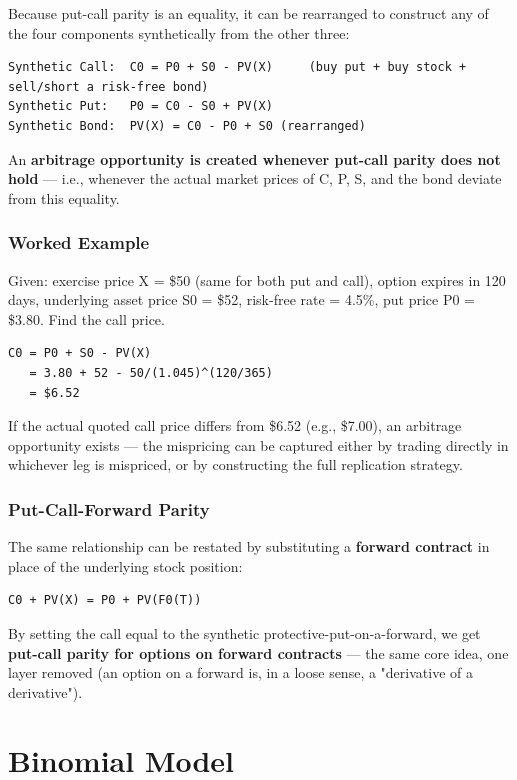 \documentclass[12pt,openany]{book}
\theoremstyle{definition}
\theoremstyle{remark}
\begin{document}
Because put-call parity is an equality, it can be rearranged to construct any of the four components synthetically from the other three:

\begin{lstlisting}[style=notesCode]
Synthetic Call:  C0 = P0 + S0 - PV(X)     (buy put + buy stock + sell/short a risk-free bond)
Synthetic Put:   P0 = C0 - S0 + PV(X)
Synthetic Bond:  PV(X) = C0 - P0 + S0 (rearranged)
\end{lstlisting}

An \textbf{arbitrage opportunity is created whenever put-call parity does not hold} — i.e., whenever the actual market prices of C, P, S, and the bond deviate from this equality.

\subsection{Worked Example}

Given: exercise price X = \$50 (same for both put and call), option expires in 120 days, underlying asset price S0 = \$52, risk-free rate = 4.5\%, put price P0 = \$3.80. Find the call price.

\begin{lstlisting}[style=notesCode]
C0 = P0 + S0 - PV(X)
   = 3.80 + 52 - 50/(1.045)^(120/365)
   = $6.52
\end{lstlisting}

If the actual quoted call price differs from \$6.52 (e.g., \$7.00), an arbitrage opportunity exists — the mispricing can be captured either by trading directly in whichever leg is mispriced, or by constructing the full replication strategy.

\subsection{Put-Call-Forward Parity}

The same relationship can be restated by substituting a \textbf{forward contract} in place of the underlying stock position:
\begin{lstlisting}[style=notesCode]
C0 + PV(X) = P0 + PV(F0(T))
\end{lstlisting}
By setting the call equal to the synthetic protective-put-on-a-forward, we get \textbf{put-call parity for options on forward contracts} — the same core idea, one layer removed (an option on a forward is, in a loose sense, a "derivative of a derivative").

\chapter{Binomial Model}
\end{document}

